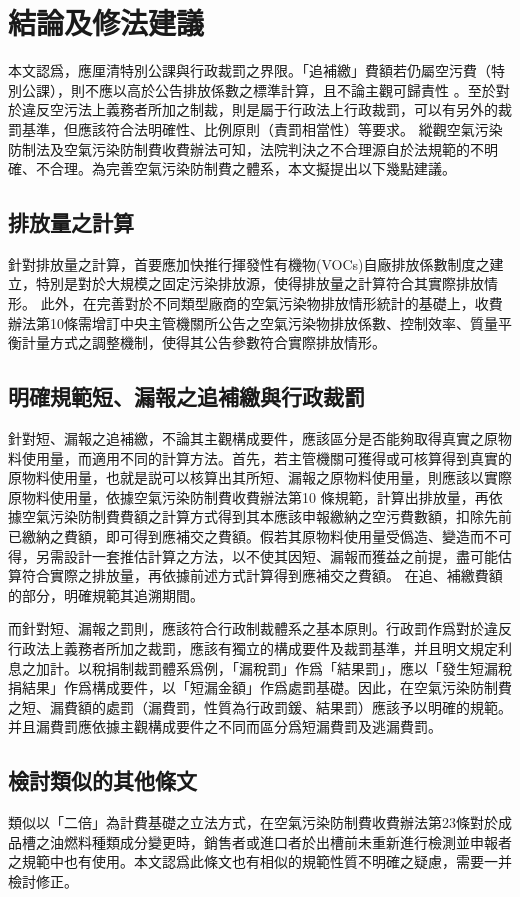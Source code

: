 \documentclass[11pt,a4paper]{article}
\begin{document}
\section{結論及修法建議}
本文認爲，應厘清特別公課與行政裁罰之界限。「追補繳」費額若仍屬空污費（特別公課），則不應以高於公告排放係數之標準計算，且不論主觀可歸責性
。至於對於違反空污法上義務者所加之制裁，則是屬于行政法上行政裁罰，可以有另外的裁罰基準，但應該符合法明確性、比例原則（責罰相當性）等要求。
縱觀空氣污染防制法及空氣污染防制費收費辦法可知，法院判決之不合理源自於法規範的不明確、不合理。為完善空氣污染防制費之體系，本文擬提出以下幾點建議。
\subsection{排放量之計算}
針對排放量之計算，首要應加快推行揮發性有機物(VOCs)自廠排放係數制度之建立，特別是對於大規模之固定污染排放源，使得排放量之計算符合其實際排放情形。
此外，在完善對於不同類型廠商的空氣污染物排放情形統計的基礎上，收費辦法第10條需增訂中央主管機關所公告之空氣污染物排放係數、控制效率、質量平衡計量方式之調整機制，使得其公告參數符合實際排放情形。


\subsection{明確規範短、漏報之追補繳與行政裁罰}
針對短、漏報之追補繳，不論其主觀構成要件，應該區分是否能夠取得真實之原物料使用量，而適用不同的計算方法。首先，若主管機關可獲得或可核算得到真實的原物料使用量，也就是説可以核算出其所短、漏報之原物料使用量，則應該以實際原物料使用量，依據空氣污染防制費收費辦法第10 條規範，計算出排放量，再依據空氣污染防制費費額之計算方式得到其本應該申報繳納之空污費數額，扣除先前已繳納之費額，即可得到應補交之費額。假若其原物料使用量受僞造、變造而不可得，另需設計一套推估計算之方法，以不使其因短、漏報而獲益之前提，盡可能估算符合實際之排放量，再依據前述方式計算得到應補交之費額。
在追、補繳費額的部分，明確規範其追溯期間。


而針對短、漏報之罰則，應該符合行政制裁體系之基本原則。行政罰作爲對於違反行政法上義務者所加之裁罰，應該有獨立的構成要件及裁罰基準，并且明文規定利息之加計。以稅捐制裁罰體系爲例，「漏稅罰」作爲「結果罰」，應以「發生短漏稅捐結果」作爲構成要件，以「短漏金額」作爲處罰基礎。因此，在空氣污染防制費之短、漏費額的處罰（漏費罰，性質為行政罰鍰、結果罰）應該予以明確的規範。并且漏費罰應依據主觀構成要件之不同而區分爲短漏費罰及逃漏費罰。

\subsection{檢討類似的其他條文}
類似以「二倍」為計費基礎之立法方式，在空氣污染防制費收費辦法第23條對於成品槽之油燃料種類成分變更時，銷售者或進口者於出槽前未重新進行檢測並申報者之規範中也有使用。本文認爲此條文也有相似的規範性質不明確之疑慮，需要一并檢討修正。
\end{document}
